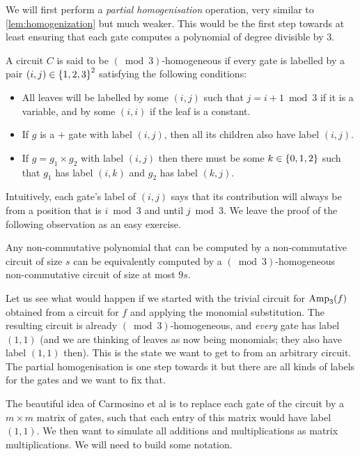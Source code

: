 We will first perform a \emph{partial homogenisation} operation, very similar to \autoref{lem:homogenization} but much weaker. This would be the first step towards at least ensuring that each gate computes a polynomial of degree divisible by $3$. 

\begin{definition} A circuit $C$ is said to be $(\bmod{3})$-homogeneous if every gate is labelled by a pair $(i,j) \in \left\{1,2,3\right\}^2$ satisfying the following conditions: 
  \begin{itemize}
  \item All leaves will be labelled by some $(i,j)$ such that $j = i+1 \bmod 3$ if it is a variable, and by some $(i,i)$ if the leaf is a constant.
  \item If $g$ is a $+$ gate with label $(i,j)$, then all its children also have label $(i,j)$.
  \item If $g = g_1 \times g_2$ with label $(i,j)$ then there must be some $k \in \left\{0,1,2\right\}$ such that $g_1$ has label $(i,k)$ and $g_2$ has label $(k,j)$. \qedhere
  \end{itemize}
\end{definition}

Intuitively, each gate's label of $(i,j)$ says that its contribution will always be from a position that is $i \bmod 3$ and until $j\bmod 3$. We leave the proof of the following observation as an easy exercise. 

\begin{observation}
  Any non-commutative polynomial that can be computed by a non-commutative circuit of size $s$ can be equivalently computed by a $(\bmod{3})$-homogeneous non-commutative circuit of size at most $9s$.  
\end{observation}

Let us see what would happen if we started with the trivial circuit for $\operatorname{Amp}_3(f)$ obtained from a circuit for $f$ and applying the monomial substitution. The resulting circuit is already $(\bmod{3})$-homogeneous, and \emph{every} gate has label $(1,1)$ (and we are thinking of leaves as now being monomials; they also have label $(1,1)$ then). This is the state we want to get to from an arbitrary circuit. The partial homogenisation is one step towards it but there are all kinds of labels for the gates and we want to fix that.

The beautiful idea of Carmosino et al \cite{CILM18} is to replace each gate of the circuit by a $m\times m$ matrix of gates, such that each entry of this matrix would have label $(1,1)$. We then want to simulate all additions and multiplications as matrix multiplications. We will need to build some notation. 

